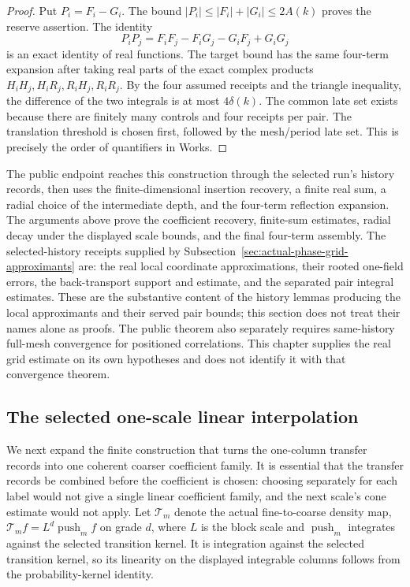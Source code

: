 \begin{proof}
Put $P_i=F_i-G_i$. The bound $|P_i|\leq |F_i|+|G_i|\leq2A(k)$ proves the
reserve assertion. The identity
\[
 P_iP_j=F_iF_j-F_iG_j-G_iF_j+G_iG_j
\]
is an exact identity of real functions. The target bound has the same
four-term expansion after taking real parts of the exact complex products
$H_iH_j,H_iR_j,R_iH_j,R_iR_j$. By the four assumed receipts and the triangle
inequality, the difference of the two integrals is at most $4\delta(k)$.
The common late set exists because there are finitely many controls and four
receipts per pair. The translation threshold is chosen first, followed by
the mesh/period late set. This is precisely the order of quantifiers in
Works.
\end{proof}

\begin{remark}
The public endpoint reaches this construction through the selected run's
history records, then uses the finite-dimensional insertion recovery, a
finite real sum, a radial choice of the intermediate depth, and the
four-term reflection expansion. The arguments above prove the coefficient
recovery, finite-sum estimates, radial decay under the displayed scale
bounds, and the final four-term assembly. The selected-history receipts supplied by
Subsection~\ref{sec:actual-phase-grid-approximants} are: the real local coordinate approximations, their rooted
one-field errors, the back-transport support and estimate, and the
separated pair integral estimates. These are the substantive content of the
history lemmas producing the local approximants and their served pair bounds;
this section does not treat their names alone as proofs. The public theorem
also separately requires same-history full-mesh convergence for positioned
correlations. This chapter supplies the real grid estimate on its own
hypotheses and does not identify it with that convergence theorem.
\end{remark}

\subsection{The selected one-scale linear interpolation}
\label{ex-selected-linear-interpolation}

We next expand the finite construction that turns the one-column transfer records into
one coherent coarser coefficient family. It is essential that the transfer records be combined
before the coefficient is chosen: choosing separately for each label would
not give a single linear coefficient family, and the next scale's cone estimate would not
apply. Let $\mathcal T_m$ denote the actual fine-to-coarse density map,
$\mathcal T_mf=L^d\operatorname{push}_mf$ on grade $d$, where $L$ is the
block scale and $\operatorname{push}_m$ integrates against the selected
transition kernel. It is integration against the
selected transition kernel, so its linearity on the displayed integrable
columns follows from the probability-kernel identity.

